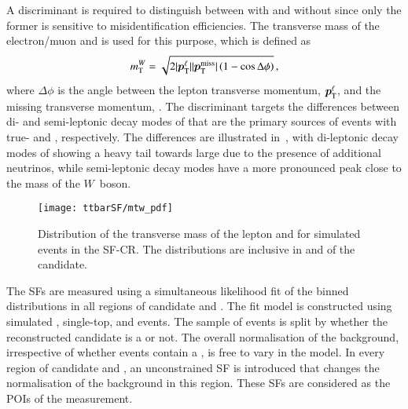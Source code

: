 A discriminant is required to distinguish between \ttbar with and without
\faketauhadvis since only the former is sensitive to \jettotauhadvis
misidentification efficiencies. The transverse mass of the electron/muon and
\pTmissAbs is used for this purpose, which is defined as
\begin{align*}
  m_{\text{T}}^W = \sqrt{2 | \bm{p}_{\text{T}}^{\ell} | | \bm{p}_{\text{T}}^{\text{miss}} | \left( 1 - \cos \Delta\phi \right)} \,\text{,}
\end{align*}
where $\Delta \phi$ is the angle between the lepton transverse momentum,
$\bm{p}_{\text{T}}^{\ell}$, and the missing transverse momentum, \pTmiss. The
\mTW discriminant targets the differences between di- and semi-leptonic decay
modes of \ttbar that are the primary sources of events with true- and
\faketauhadvis, respectively. The differences are illustrated
in~, with di-leptonic decay modes of \ttbar showing a
heavy tail towards large \mTW due to the presence of additional neutrinos, while
semi-leptonic decay modes have a more pronounced peak close to the mass of the
$W$~boson.


\begin{figure}[htbp]
  \centering

  \texttt{[image: ttbarSF/mtw\_pdf]}

  \caption[Distribution of the transverse mass of the lepton and \pTmiss for
  simulated \ttbar events in the SF-CR.]{Distribution of the transverse mass of
    the lepton and \pTmiss for simulated \ttbar events in the SF-CR. The
    distributions are inclusive in \pT and \Ntracks of the \tauhadvis
    candidate.}%
  \label{fig:ttbarsf_mtw_pdf}
\end{figure}

The \faketauhadvis SFs are measured using a simultaneous likelihood fit of the
binned \mTW distributions in all regions of \tauhadvis candidate \pT and
\Ntracks. The fit model is constructed using simulated \ttbar, single-top, and
\Vjets events. The sample of \ttbar events is split by whether the reconstructed
\tauhadvis candidate is a \faketauhadvis or not. The overall normalisation of
the \ttbar background, irrespective of whether events contain a \faketauhadvis,
is free to vary in the model.  In every region of \tauhadvis candidate
\Ntracks and \pT, an unconstrained SF is introduced that changes the
normalisation of the \ttbarFakes background in this region. These \faketauhadvis
SFs are considered as the POIs of the measurement.

